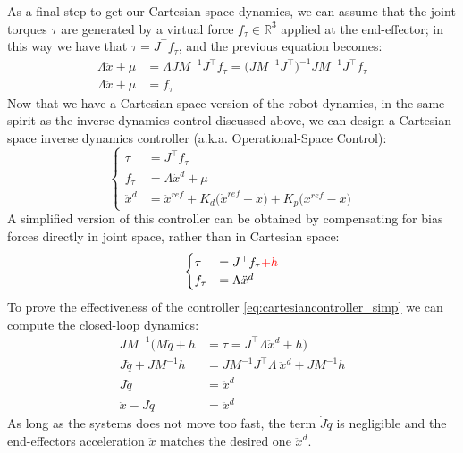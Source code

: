 	As a final step to get our Cartesian-space dynamics, we can assume that the joint torques $\tau$ are generated by a virtual force $f_\tau \in \mathds R^3$ applied at the end-effector; in this way we have that $\tau = J^\top f_\tau$, and the previous equation becomes:
	\begin{equation} \label{eq:temp:3}
	\begin{split}
		\Lambda \ddot x + \mu & = \Lambda J M^{-1} J^\top f_\tau = \big(JM^{-1}J^\top\big)^{-1} J M^{-1} J^\top f_\tau \\ 
		\Lambda \ddot x + \mu & = f_\tau
	\end{split}
	\end{equation}
	Now that we have a Cartesian-space version of the robot dynamics, in the same spirit as the inverse-dynamics control discussed above, we can design a Cartesian-space inverse dynamics controller (a.k.a. Operational-Space Control):
	\begin{equation} \label{eq:cartesiancontroller}
	\begin{cases}
		\tau & = J^\top f_\tau \\
		f_\tau & = \Lambda \ddot x^d + \mu \\
		\ddot x^d & = \ddot x^{ref} + K_d\big(\dot x^{ref} - \dot x\big) + K_p\big(x^{ref} - x\big)
	\end{cases}
	\end{equation}
	A simplified version of this controller can be obtained by compensating for bias forces directly in joint space, rather than in Cartesian space:
	\begin{equation} \label{eq:cartesiancontroller_simp}
	\begin{cases}
		\tau & = J^\top f_\tau \textcolor{red}{+ h}\\
		f_\tau & = \Lambda \ddot x^d
	\end{cases}
	\end{equation}
	To prove the effectiveness of the controller \eqref{eq:cartesiancontroller_simp} we can compute the closed-loop dynamics:
	\begin{align*}
		JM^{-1} \Big( M \ddot q + h & = \tau = J^\top \Lambda \ddot x^d + h \Big) \\
		J \ddot q + JM^{-1} h & = JM^{-1}J^\top \Lambda \  \ddot x^d + JM^{-1} h \\
		J \ddot q & = \ddot x^d \\
		\ddot x - \dot J \dot q & = \ddot x^d
	\end{align*}
	As long as the systems does not move too fast, the term $\dot J \dot q$ is negligible and the end-effectors acceleration $\ddot x$ matches the desired one $\ddot x^d$.
	

